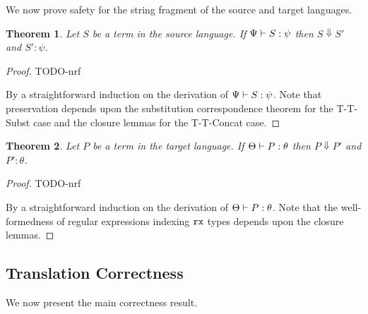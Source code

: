 \documentclass[10pt,preprint]{sigplanconf}
\newtheorem{thm}{Theorem}
\theoremstyle{definition}
\newcommand{\sreduces}{ \Downarrow }
\begin{document}
We now prove safety for the string fragment of the source and target languages.

\begin{thm}
  Let $S$ be a term in the source language. If $\Psi \vdash S : \psi$ 
  then $S \sreduces S'$ and $S' : \psi$.
\end{thm}
\begin{proof}
  TODO-nrf

By a straightforward induction on the derivation of $\Psi \vdash S : \psi$.
Note that preservation depends upon the substitution correspondence theorem
for the T-T-Subst case and the closure lemmas for the T-T-Concat case.
\end{proof}

\begin{thm}
  Let $P$ be a term in the target language. If $\Theta \vdash P : \theta$ 
  then $P \sreduces P'$ and $P' : \theta$.
\end{thm}
\begin{proof}
TODO-nrf

  By a straightforward induction on the derivation of $\Theta \vdash P : \theta$.
Note that the well-formedness of regular expressions indexing ${\tt rx}$ types
depends upon the closure lemmas.
\end{proof}

\subsection{Translation Correctness}

We now present the main correctness result.
\end{document}
